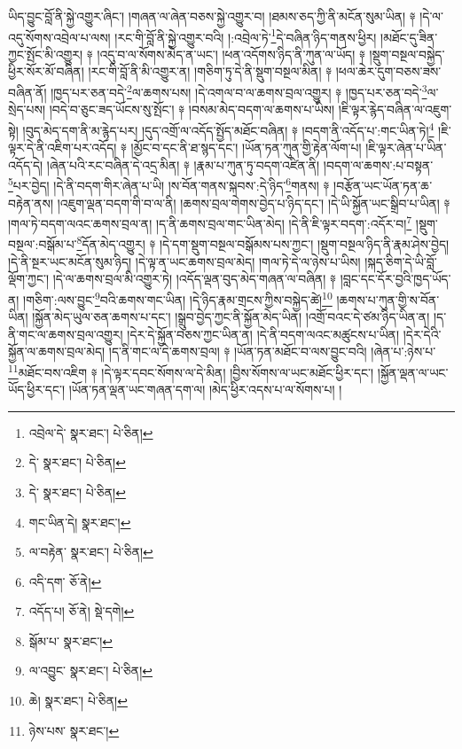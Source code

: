 ཡིད་བྱུང་བློ་ནི་སྐྱེ་འགྱུར་ཞིང་། །གཞན་ལ་ཞེན་བཅས་སྐྱེ་འགྱུར་བ། །ཐམས་ཅད་ཀྱི་ནི་མངོན་སུམ་ཡིན། ༈ །དེ་ལ་འདུ་སོགས་འབྲེལ་པ་ལས། །རང་གི་བློ་ནི་སྐྱེ་འགྱུར་བའི། །:འབྲེལ་ཏེ་\footnote{འབྲེལ་དེ་  སྣར་ཐང་།  པེ་ཅིན། }དེ་བཞིན་ཉིད་གནས་ཕྱིར། །མཐོང་དུ་ཟིན་ཀྱང་སྤོང་མི་འགྱུར། ༈ །འདུ་བ་ལ་སོགས་མེད་ན་ཡང་། །ཕན་འདོགས་ཉིད་ནི་ཀུན་ལ་ཡོད། ༈ །སྡུག་བསྔལ་བསྐྱེད་ཕྱིར་སོར་མོ་བཞིན། །རང་གི་བློ་ནི་མི་འགྱུར་ན། །གཅིག་ཏུ་དེ་ནི་སྡུག་བསྔལ་མིན། ༈ །ཕལ་ཆེར་དུག་བཅས་ཟས་བཞིན་ནོ། །ཁྱད་པར་ཅན་བདེ་\footnote{དེ་  སྣར་ཐང་།  པེ་ཅིན། }ལ་ཆགས་པས། །དེ་འགལ་བ་ལ་ཆགས་བྲལ་འགྱུར། ༈ །ཁྱད་པར་ཅན་བདེ་\footnote{དེ་  སྣར་ཐང་།  པེ་ཅིན། }ལ་སྲེད་པས། །བདེ་བ་ཅུང་ཟད་ཡོངས་སུ་སྤོང་། ༈ །བསམ་མེད་བདག་ལ་ཆགས་པ་ཡིས། །ཇི་ལྟར་རྙེད་བཞིན་ལ་འཇུག་སྟེ། །བུད་མེད་དག་ནི་མ་རྙེད་པར། །དུད་འགྲོ་ལ་འདོད་སྤྱོད་མཐོང་བཞིན། ༈ །བདག་ནི་འདོད་པ་:གང་ཡིན་ཏེ།\footnote{གང་ཡིན་དེ།  སྣར་ཐང་། } །ཇི་ལྟར་དེ་ནི་འཇིག་པར་འདོད། ༈ །མྱོང་བ་དང་ནི་ཐ་སྙད་དང་། །ཡོན་ཏན་ཀུན་གྱི་རྟེན་ལོག་པ། །ཇི་ལྟར་ཞེན་པ་ཡིན་འདོད་དེ། །ཞེན་པའི་རང་བཞིན་དེ་འདྲ་མིན། ༈ །རྣམ་པ་ཀུན་ཏུ་བདག་འཛིན་ནི། །བདག་ལ་ཆགས་:པ་བསྟན་\footnote{ལ་བརྟེན་  སྣར་ཐང་།  པེ་ཅིན། }པར་བྱེད། །དེ་ནི་བདག་གིར་ཞེན་པ་ཡི། །ས་བོན་གནས་སྐབས་:དེ་ཉིད་\footnote{འདི་དག་  ཅོ་ནེ། }གནས། ༈ །བརྩོན་ཡང་ཡོན་ཏན་ཆ་བརྟེན་ནས། །འཇུག་ལྡན་བདག་གི་བ་ལ་ནི། །ཆགས་བྲལ་གེགས་བྱེད་པ་ཉིད་དང་། །དེ་ཡི་སྐྱོན་ཡང་སྒྲིབ་པ་ཡིན། ༈ །གལ་ཏེ་བདག་ལའང་ཆགས་བྲལ་ན། །ད་ནི་ཆགས་བྲལ་གང་ཡིན་མེད། །དེ་ནི་ཇི་ལྟར་བདག་:འདོར་བ།\footnote{འདོད་པ།  ཅོ་ནེ།  སྡེ་དགེ། } །སྡུག་བསྔལ་:བསྒོམ་པ་\footnote{སྒོམ་པ་  སྣར་ཐང་། }དོན་མེད་འགྱུར། ༈ །དེ་དག་སྡུག་བསྔལ་བསྒོམས་པས་ཀྱང་། །སྡུག་བསྔལ་ཉིད་ནི་རྣམ་ཤེས་བྱེད། །དེ་ནི་སྔར་ཡང་མངོན་སུམ་ཉིད། །དེ་ལྟ་ན་ཡང་ཆགས་བྲལ་མེད། །གལ་ཏེ་དེ་ལ་ཉེས་པ་ཡིས། །སྐད་ཅིག་དེ་ཡི་བློ་ལྡོག་ཀྱང་། །དེ་ལ་ཆགས་བྲལ་མི་འགྱུར་ཏེ། །འདོད་ལྡན་བུད་མེད་གཞན་ལ་བཞིན། ༈ །བླང་དང་དོར་བྱའི་ཁྱད་ཡོད་ན། །གཅིག་:ལས་བྱུང་\footnote{ལ་འབྱུང་  སྣར་ཐང་།  པེ་ཅིན། }བའི་ཆགས་གང་ཡིན། །དེ་ཉིད་རྣམ་གྲངས་ཀྱིས་བསྐྱེད་ཚེ།\footnote{ཆེ།  སྣར་ཐང་།  པེ་ཅིན། } །ཆགས་པ་ཀུན་གྱི་ས་བོན་ཡིན། །སྐྱོན་མེད་ཡུལ་ཅན་ཆགས་པ་དང་། །སྒྲུབ་བྱེད་ཀྱང་ནི་སྐྱོན་མེད་ཡིན། །འགྲོ་བའང་དེ་ཙམ་ཉིད་ཡིན་ན། །ད་ནི་གང་ལ་ཆགས་བྲལ་འགྱུར། །དེར་དེ་སྐྱོན་བཅས་ཀྱང་ཡིན་ན། །དེ་ནི་བདག་ལའང་མཚུངས་པ་ཡིན། །དེར་དེའི་སྐྱོན་ལ་ཆགས་བྲལ་མེད། །ད་ནི་གང་ལ་དེ་ཆགས་བྲལ། ༈ །ཡོན་ཏན་མཐོང་བ་ལས་བྱུང་བའི། །ཞེན་པ་:ཉེས་པ་\footnote{ཉེས་པས་  སྣར་ཐང་། }མཐོང་བས་འཇིག ༈ །དེ་ལྟར་དབང་སོགས་ལ་དེ་མིན། །བྱིས་སོགས་ལ་ཡང་མཐོང་ཕྱིར་དང་། །སྐྱོན་ལྡན་ལ་ཡང་ཡོད་ཕྱིར་དང་། །ཡོན་ཏན་ལྡན་ཡང་གཞན་དག་ལ། །མེད་ཕྱིར་འདས་པ་ལ་སོགས་པ། །
